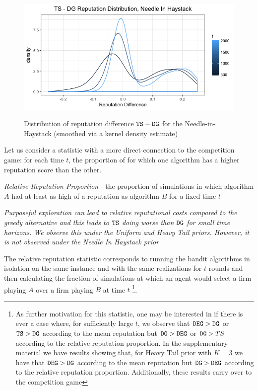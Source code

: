 \documentclass[../competing_bandits.tex]{subfiles}
\begin{document}
{\begin{figure}[H]
\caption{Distribution of reputation difference $\mathtt{TS}-\mathtt{DG}$ for the Needle-in-Haystack (smoothed via a kernel density estimate)}
\includegraphics[scale=0.35]{figures/ts_dg_rep_diff_nih}
\label{ts_dg_rep_diff_nih}
\end{figure}

Let us consider a statistic with a more direct connection to the competition game: for each time $t$, the proportion of \MRVs for which one algorithm has a higher reputation score than the other. 


\begin{definition}
\textit{Relative Reputation Proportion} - the proportion of simulations in which algorithm $A$ had at least as high of a reputation as algorithm $B$ for a fixed time $t$
\end{definition}


\begin{finding}
\textit{Purposeful exploration can lead to relative reputational costs compared to the greedy alternative and this leads to $\mathtt{TS}$ doing worse than $\mathtt{DG}$ for small time horizons. We observe this under the Uniform and Heavy Tail priors. However, it is not observed under the Needle In Haystack prior}
\end{finding}

The relative reputation statistic corresponds to running the bandit algorithms in isolation on the same instance and with the same realizations for $t$ rounds and then calculating the fraction of simulations at which an agent would select a firm playing $A$ over a firm playing $B$ at time $t$ \footnote{As further motivation for this statistic, one may be interested in if there is ever a case where, for sufficiently large $t$, we observe that $\mathtt{DEG} >\mathtt{DG}$ or $\mathtt{TS} > \mathtt{DG}$ according to the mean reputation but $\mathtt{DG} > \mathtt{DEG}$ or $\mathtt{DG} > TS$ according to the relative reputation proportion. In the supplementary material we have results showing that, for Heavy Tail prior with $K=3$ we have that $\mathtt{DEG} > \mathtt{DG}$ according to the mean reputation but $\mathtt{DG} > \mathtt{DEG}$ according to the relative reputation proportion. Additionally, these results carry over to the competition game}.

}
\end{document}
